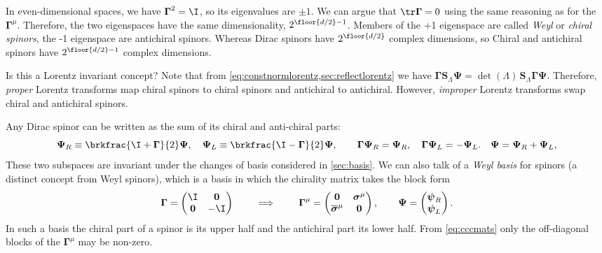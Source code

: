\documentclass[11pt]{article}
\newcommand{\Gammab}{\boldsymbol{\Gamma}}
\renewcommand{\S}{\mathbf{S}}
\newcommand{\sigmab}{\boldsymbol{\sigma}}
\newcommand{\psib}{\boldsymbol{\psi}}
\newcommand{\Psib}{\boldsymbol{\Psi}}
\begin{document}
In even-dimensional spaces, we have \(\Gammab^2 = \I\), so its eigenvalues are \(\pm 1\).
We can argue that \(\tr \Gammab = 0\) using the same reasoning as for the \(\Gammab^\mu\).
Therefore, the two eigenspaces have the same dimensionality, \(2^{\floor{d/2}-1}\).
Members of the +1 eigenspace are called \emph{Weyl} or \emph{chiral spinors}, the -1 eigenspace are antichiral spinors.
Whereas Dirac spinors have \(2^{\floor{d/2}}\) complex dimensions, so Chiral and antichiral spinors have \(2^{\floor{d/2}-1}\) complex dimensions.

Is this a Lorentz invariant concept?
Note that from \cref{eq:constnormlorentz,sec:reflectlorentz} we have \(\Gammab \S_\Lambda \Psib = \det (\Lambda)\, \S_\Lambda \Gammab \Psib\).
Therefore, \emph{proper} Lorentz transforms map chiral spinors to chiral spinors and antichiral to antichiral.
However, \emph{improper} Lorentz transforms swap chiral and antichiral spinors.

Any Dirac spinor can be written as the sum of its chiral and anti-chiral parts:
%
\begin{equation}\label{eq:Weylanti}
  \Psib_R \equiv \brkfrac{\I+\Gammab}{2} \Psib,
  \quad
  \Psib_L \equiv \brkfrac{\I-\Gammab}{2} \Psib,
  \qquad
  \Gammab \Psib_R = \Psib_R,
  \quad
  \Gammab \Psib_L = - \Psib_L.
  \quad
  \Psib = \Psib_R + \Psib_L,
\end{equation}
%
These two subspaces are invariant under the changes of basis considered in \cref{sec:basis}.
We can also talk of a \emph{Weyl basis} for spinors (a distinct concept from Weyl spinors), which is a basis in which the chirality matrix takes the block form
%
\begin{equation}\label{eq:weylbasis}
  \Gammab = \begin{pmatrix}
              \I         & \mathbf{0} \\
              \mathbf{0} & -\I        \\
            \end{pmatrix}
  \qquad
  \implies
  \qquad
  \Gammab^\mu = \begin{pmatrix}
                  \mathbf{0} & \sigmab^\mu \\
                  \overline{\sigmab}^\mu & \mathbf{0} \\
                \end{pmatrix}
  ,
  \qquad
  \Psib = \begin{pmatrix}
            \psib_R \\
            \psib_L \\
          \end{pmatrix}
  .
\end{equation}
%
In such a basis the chiral part of a spinor is its upper half and the antichiral part its lower half.
From \cref{eq:cccmats} only the off-diagonal blocks of the \(\Gammab^\mu\) may be non-zero.
\end{document}
